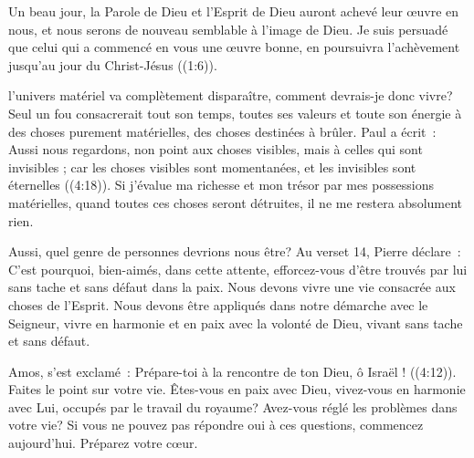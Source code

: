 Un beau jour, la Parole de Dieu et l'Esprit de Dieu auront achevé leur \oe{}uvre
 en nous, et nous serons de nouveau semblable à l'image de Dieu.
 \og Je suis persuadé que celui qui a commencé en vous une œuvre bonne,
 en poursuivra l'achèvement jusqu'au jour du Christ-Jésus \fg{}
 ((1:6)).

\dvrule






 l'univers matériel va complètement
 disparaître, comment devrais-je donc vivre? Seul un fou consacrerait
 tout son temps, toutes ses valeurs et toute son énergie à des choses purement
 matérielles, des choses destinées à brûler. Paul a écrit~: 
 \og Aussi nous regardons, non point aux choses visibles,
 mais à celles qui sont invisibles ; car les choses visibles sont momentanées,
 et les invisibles sont éternelles \fg{} ((4:18)).
 Si j'évalue ma richesse et mon trésor par mes possessions matérielles,
 quand toutes ces choses seront détruites, il ne me restera absolument rien.

Aussi, quel genre de personnes devrions nous être? Au verset 14,
 Pierre déclare~: 
 \og C'est pourquoi, bien-aimés, dans cette attente,
 efforcez-vous d'être trouvés par lui sans tache et sans défaut
 dans la paix. \fg{}
 Nous devons vivre une vie consacrée aux choses de l'Esprit.
 Nous devons être appliqués dans notre démarche avec le Seigneur,
 vivre en harmonie et en paix avec la volonté de Dieu,
 vivant sans tache et sans défaut.


Amos, s'est exclamé~: 
 \og Prépare-toi à la rencontre de ton Dieu, ô Israël ! \fg{}
 ((4:12)).
 Faites le point sur votre vie. Êtes-vous en paix avec Dieu,
 vivez-vous en harmonie avec Lui, occupés par le travail du royaume?
 Avez-vous réglé les problèmes dans votre vie? Si vous ne pouvez pas répondre
 \og oui \fg{} à ces questions, commencez aujourd'hui. Préparez votre c\oe{}ur.

